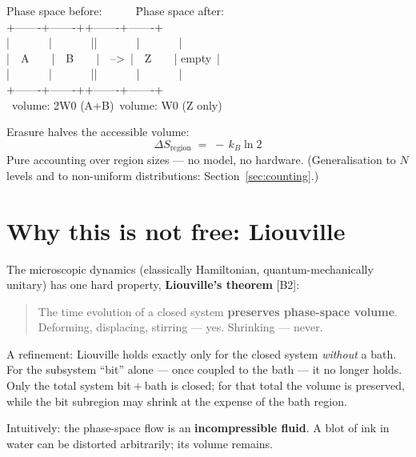 \begin{center}
\begin{minipage}{0.78\textwidth}
\ttfamily\small
\begin{tabbing}
Phase space before:\ \ \ \ \ \ \=Phase space after:\\[0.3em]
+-------+-------+\>+-------+-------+\\
|\ \ \ \ \ \ \ |\ \ \ \ \ \ \ |\>|\ \ \ \ \ \ \ |\ \ \ \ \ \ \ |\\
|\ \ A\ \ \ \ |\ \ B\ \ \ \ |\ \ -->\ \>|\ \ Z\ \ \ \ | empty\ |\\
|\ \ \ \ \ \ \ |\ \ \ \ \ \ \ |\>|\ \ \ \ \ \ \ |\ \ \ \ \ \ \ |\\
+-------+-------+\>+-------+-------+\\
\ volume: 2W0 (A+B)\>\ volume: W0 (Z only)
\end{tabbing}
\end{minipage}
\end{center}

\LB Erasure halves the accessible volume:
\[
  \Delta S_{\text{region}} \;=\; -\,k_B \ln 2
\]
Pure accounting over region sizes --- no model, no hardware. (Generalisation to
$N$ levels and to non-uniform distributions: Section~\ref{sec:counting}.)

\section{Why this is not free: Liouville}
\label{sec:liouville}

The microscopic dynamics (classically Hamiltonian, quantum-mechanically unitary)
has one hard property, \textbf{Liouville's theorem} [B2]:

\begin{quote}
\LB The time evolution of a closed system \textbf{preserves phase-space volume}.
Deforming, displacing, stirring --- yes. Shrinking --- never.
\end{quote}

A refinement: Liouville holds exactly only for the closed system \emph{without} a
bath. For the subsystem “bit” alone --- once coupled to the bath --- it no longer
holds. Only the total system bit${}+{}$bath is closed; for that total the volume
is preserved, while the bit subregion may shrink at the expense of the bath
region.

Intuitively: the phase-space flow is an \textbf{incompressible fluid}. A blot of
ink in water can be distorted arbitrarily; its volume remains.

